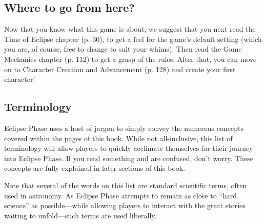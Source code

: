 \subsection{Where to go from here?}
\label{sec:where-go-from}

Now that you know what this game is about, we suggest that you next read the Time of Eclipse chapter (p. 30), to get a feel for the game's default setting (which you are, of course, free to change to suit your whims). Then read the Game Mechanics chapter (p. 112) to get a grasp of the rules. After that, you can move on to Character Creation and Advancement (p. 128) and create your first character!


\subsection{Terminology}
\label{sec:terminology}

Eclipse Phase uses a host of jargon to simply convey the numerous concepts covered within the pages of this book. While not all-inclusive, this list of terminology will allow players to quickly acclimate themselves for their journey into Eclipse Phase. If you read something and are confused, don't worry. These concepts are fully explained in later sections of this book.

Note that several of the words on this list are standard scientific terms, often used in astronomy. As Eclipse Phase attempts to remain as close to ``hard science'' as possible—while allowing players to interact with the great stories waiting to unfold—such terms are used liberally.

